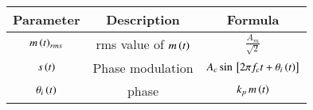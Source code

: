\setlength{\arrayrulewidth}{0.3mm}
\setlength{\tabcolsep}{20pt}
\renewcommand{\arraystretch}{1.6}


\begin{tabular}{|c|c|c|}
\hline
Parameter & Description & Formula\\
\hline
$m\left(t\right)_{rms}$ & rms value of $m\left(t\right)$ & $\frac{A_m}{\sqrt{2}}$\\
\hline
$s\left(t\right)$ & Phase modulation & $A_c\sin {}\left[2\pi f_c t + \theta _i\left(t\right)\right]$\\
\hline
$\theta _i\left(t\right)$ & phase & $k_p\, m\left(t\right)$\\
\hline
\end{tabular}
